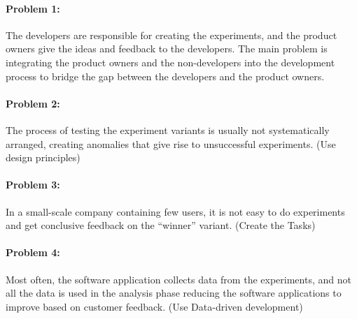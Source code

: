 \paragraph{Problem 1:} The developers are responsible for creating the experiments, and the product owners give the ideas and feedback to the developers.
The main problem is integrating the product owners and the non-developers into the development process to bridge the gap between the developers and the product owners.

\paragraph{Problem 2:} The process of testing the experiment variants is usually not systematically arranged, creating anomalies that give rise to unsuccessful experiments. (Use design principles)

\paragraph{Problem 3:} In a small-scale company containing few users, it is not easy to do experiments and get conclusive feedback on the ``winner'' variant. (Create the Tasks)

\paragraph{Problem 4:} Most often, the software application collects data from the experiments, and not all the data is used in the analysis phase reducing the software applications to improve based on customer feedback. (Use Data-driven development)

